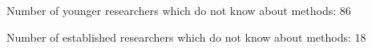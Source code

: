 Number of younger researchers which do not know about methods: 86

Number of established researchers which do not know about methods: 18

